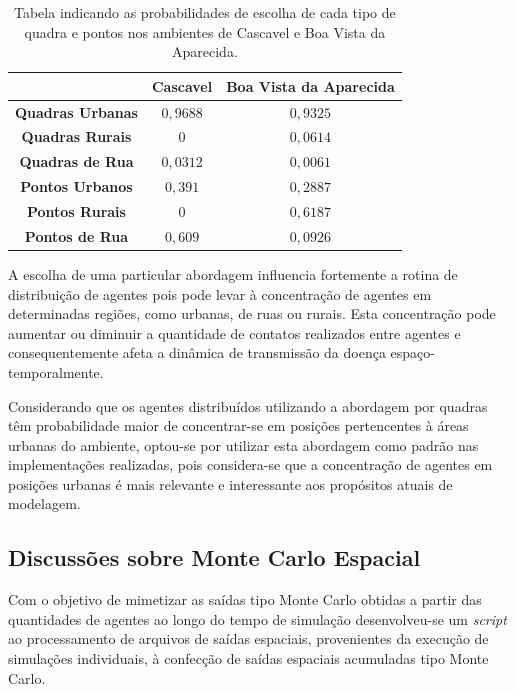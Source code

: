 \begin{table}[H]
\centering
\begin{tabular}{c|c|c}
				& \textbf{Cascavel}		& \textbf{Boa Vista da Aparecida} 	\\ \hline
 \textbf{Quadras Urbanas}	& $0,9688$			& $0,9325$	  			\\
 \textbf{Quadras Rurais} 	& $0$				& $0,0614$	  			\\
 \textbf{Quadras de Rua}	& $0,0312$			& $0,0061$	  			\\ \hline
 \textbf{Pontos Urbanos}	& $0,391$			& $0,2887$	  			\\ 
 \textbf{Pontos Rurais}		& $0$				& $0,6187$  				\\
 \textbf{Pontos de Rua}		& $0,609$			& $0,0926$  				\\
 \end{tabular}
\caption{Tabela indicando as probabilidades de escolha de cada tipo de quadra e pontos nos ambientes de Cascavel e Boa Vista da Aparecida. }
\label{tab:perc_quadras_pontos}
\end{table}

A escolha de uma particular abordagem influencia fortemente a rotina de distribuição de agentes pois pode levar à concentração de agentes em determinadas regiões, como urbanas, de ruas ou rurais. Esta concentração pode aumentar ou diminuir a quantidade de contatos realizados entre agentes e consequentemente afeta a dinâmica de transmissão da doença espaço-temporalmente. 

Considerando que os agentes distribuídos utilizando a abordagem por quadras têm probabilidade maior de concentrar-se em posições pertencentes à áreas urbanas do ambiente, optou-se por utilizar esta abordagem como padrão nas implementações realizadas, pois considera-se que a concentração de agentes em posições urbanas é mais relevante e interessante aos propósitos atuais de modelagem. 

\subsection{Discussões sobre Monte Carlo Espacial}

Com o objetivo de mimetizar as saídas tipo Monte Carlo obtidas a partir das quantidades de agentes ao longo do tempo de simulação desenvolveu-se um \textit{script} ao processamento de arquivos de saídas espaciais, provenientes da execução de simulações individuais, à confecção de saídas espaciais acumuladas tipo Monte Carlo. 

